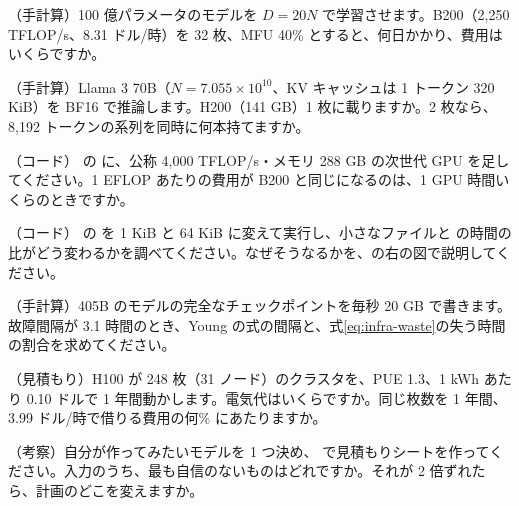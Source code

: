\begin{exercises}
\item （手計算）100 億パラメータのモデルを $D=20N$ で学習させます。B200（2,250 TFLOP/s、8.31 ドル/時）を 32 枚、MFU 40\% とすると、何日かかり、費用はいくらですか。
\item （手計算）Llama 3 70B（$N=7.055\times10^{10}$、KV キャッシュは 1 トークン 320 KiB）を BF16 で推論します。H200（141 GB）1 枚に載りますか。2 枚なら、8,192 トークンの系列を同時に何本持てますか。
\item （コード） の  に、公称 4,000 TFLOP/s・メモリ 288 GB の次世代 GPU を足してください。1 EFLOP あたりの費用が B200 と同じになるのは、1 GPU 時間いくらのときですか。
\item （コード） の  を 1 KiB と 64 KiB に変えて実行し、小さなファイルと  の時間の比がどう変わるかを調べてください。なぜそうなるかを、の右の図で説明してください。
\item （手計算）405B のモデルの完全なチェックポイントを毎秒 20 GB で書きます。故障間隔が 3.1 時間のとき、Young の式の間隔と、式\eqref{eq:infra-waste}の失う時間の割合を求めてください。
\item （見積もり）H100 が 248 枚（31 ノード）のクラスタを、PUE 1.3、1 kWh あたり 0.10 ドルで 1 年間動かします。電気代はいくらですか。同じ枚数を 1 年間、3.99 ドル/時で借りる費用の何\% にあたりますか。
\item （考察）自分が作ってみたいモデルを 1 つ決め、 で見積もりシートを作ってください。入力のうち、最も自信のないものはどれですか。それが 2 倍ずれたら、計画のどこを変えますか。
\end{exercises}
